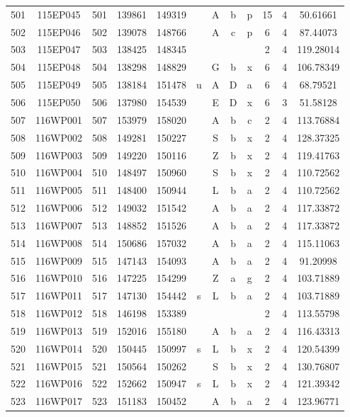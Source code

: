 \begin{tabular}{|*{12}{c|}}
501 & 115EP045 & 501 & 139861 & 149319 &  & A & b & p & 15 & 4 & 50.61661 \\ 
502 & 115EP046 & 502 & 139078 & 148766 &  & A & c & p & 6 & 4 & 87.44073 \\ 
503 & 115EP047 & 503 & 138425 & 148345 &  &  &  &  & 2 & 4 & 119.28014 \\ 
504 & 115EP048 & 504 & 138298 & 148829 &  & G & b & x & 6 & 4 & 106.78349 \\ 
505 & 115EP049 & 505 & 138184 & 151478 & u & A & D & a & 6 & 4 & 68.79521 \\ 
506 & 115EP050 & 506 & 137980 & 154539 &  & E & D & x & 6 & 3 & 51.58128 \\ 
507 & 116WP001 & 507 & 153979 & 158020 &  & A & b & c & 2 & 4 & 113.76884 \\ 
508 & 116WP002 & 508 & 149281 & 150227 &  & S & b & x & 2 & 4 & 128.37325 \\ 
509 & 116WP003 & 509 & 149220 & 150116 &  & Z & b & x & 2 & 4 & 119.41763 \\ 
510 & 116WP004 & 510 & 148497 & 150960 &  & S & b & x & 2 & 4 & 110.72562 \\ 
511 & 116WP005 & 511 & 148400 & 150944 &  & L & b & a & 2 & 4 & 110.72562 \\ 
512 & 116WP006 & 512 & 149032 & 151542 &  & A & b & a & 2 & 4 & 117.33872 \\ 
513 & 116WP007 & 513 & 148852 & 151526 &  & A & b & a & 2 & 4 & 117.33872 \\ 
514 & 116WP008 & 514 & 150686 & 157032 &  & A & b & a & 2 & 4 & 115.11063 \\ 
515 & 116WP009 & 515 & 147143 & 154093 &  & A & b & a & 2 & 4 & 91.20998 \\ 
516 & 116WP010 & 516 & 147225 & 154299 &  & Z & a & g & 2 & 4 & 103.71889 \\ 
517 & 116WP011 & 517 & 147130 & 154442 & s & L & b & a & 2 & 4 & 103.71889 \\ 
518 & 116WP012 & 518 & 146198 & 153389 &  &  &  &  & 2 & 4 & 113.55798 \\ 
519 & 116WP013 & 519 & 152016 & 155180 &  & A & b & a & 2 & 4 & 116.43313 \\ 
520 & 116WP014 & 520 & 150445 & 150997 & s & L & b & x & 2 & 4 & 120.54399 \\ 
521 & 116WP015 & 521 & 150564 & 150262 &  & S & b & x & 2 & 4 & 130.76807 \\ 
522 & 116WP016 & 522 & 152662 & 150947 & s & L & b & x & 2 & 4 & 121.39342 \\ 
523 & 116WP017 & 523 & 151183 & 150452 &  & A & b & a & 2 & 4 & 123.96771 \\ 

\end{tabular}
